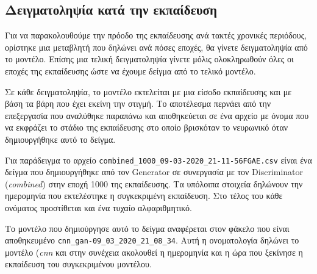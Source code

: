 \subsection{Δειγματοληψία κατά την εκπαίδευση}
Για να παρακολουθούμε την πρόοδο της εκπαίδευσης ανά τακτές χρονικές περιόδους, ορίστηκε μια μεταβλητή που δηλώνει ανά πόσες εποχές, θα γίνετε δειγματοληψία από το μοντέλο. Επίσης μια τελική δειγματοληψία γίνετε μόλις ολοκληρωθούν όλες οι εποχές της εκπαίδευσης ώστε να έχουμε δείγμα από το τελικό μοντέλο. 
\par
Σε κάθε δειγματοληψία, το μοντέλο εκτελείται με μια είσοδο εκπαίδευσης και με βάση τα βάρη που έχει εκείνη την στιγμή. Το αποτέλεσμα περνάει από την επεξεργασία που αναλύθηκε παραπάνω και αποθηκεύεται σε ένα αρχείο με όνομα που να εκφράζει το στάδιο της εκπαίδευσης στο οποίο βρισκόταν το νευρωνικό όταν δημιουργήθηκε αυτό το δείγμα.
\par
Για παράδειγμα το αρχείο \verb|combined_1000_09-03-2020_21-11-56FGAE.csv| είναι ένα δείγμα που δημιουργήθηκε από τον Generator σε συνεργασία με τον Discriminator (\textit{combined}) στην εποχή 1000 της εκπαίδευσης. Τα υπόλοιπα στοιχεία δηλώνουν την ημερομηνία που εκτελέστηκε η συγκεκριμένη εκπαίδευση. Στο τέλος του κάθε ονόματος προστίθεται και ένα τυχαίο αλφαριθμητικό. 
\par
Το μοντέλο που δημιούργησε αυτό το δείγμα αναφέρεται στον φάκελο που είναι αποθηκευμένο \verb|cnn_gan-09_03_2020_21_08_34|. Αυτή η ονοματολογία δηλώνει το μοντέλο (\textit{cnn} και στην συνέχεια ακολουθεί η ημερομηνία και η ώρα που ξεκίνησε η εκπαίδευση του συγκεκριμένου μοντέλου.

